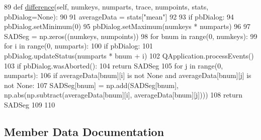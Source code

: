 \begin{DoxyCode}
89     \textcolor{keyword}{def }\hyperlink{classsoftware_1_1chipwhisperer_1_1analyzer_1_1utils_1_1TraceExplorerScripts_1_1PartitionDisplay_1_1DifferenceModeSAD_a0590799aa1f80c95b6f3bf358add5cf7}{difference}(self, numkeys, numparts, trace, numpoints, stats, pbDialog=None):
90 
91         averageData = stats[\textcolor{stringliteral}{"mean"}]
92 
93         \textcolor{keywordflow}{if} pbDialog:
94             pbDialog.setMinimum(0)
95             pbDialog.setMaximum(numkeys * numparts)
96 
97         SADSeg = np.zeros((numkeys, numpoints))
98         \textcolor{keywordflow}{for} bnum \textcolor{keywordflow}{in} range(0, numkeys):
99             \textcolor{keywordflow}{for} i \textcolor{keywordflow}{in} range(0, numparts):
100                 \textcolor{keywordflow}{if} pbDialog:
101                     pbDialog.updateStatus(numparts * bnum + i)
102                     QApplication.processEvents()
103                     \textcolor{keywordflow}{if} pbDialog.wasAborted():
104                         \textcolor{keywordflow}{return} SADSeg
105                 \textcolor{keywordflow}{for} j \textcolor{keywordflow}{in} range(0, numparts):
106                     \textcolor{keywordflow}{if} averageData[bnum][i] \textcolor{keywordflow}{is} \textcolor{keywordflow}{not} \textcolor{keywordtype}{None} \textcolor{keywordflow}{and} averageData[bnum][j] \textcolor{keywordflow}{is} \textcolor{keywordflow}{not} \textcolor{keywordtype}{None}:
107                         SADSeg[bnum] = np.add(SADSeg[bnum], np.abs(np.subtract(averageData[bnum][i], 
      averageData[bnum][j])))
108         \textcolor{keywordflow}{return} SADSeg
109 
110 
\end{DoxyCode}


\subsection{Member Data Documentation}
\hypertarget{classsoftware_1_1chipwhisperer_1_1analyzer_1_1utils_1_1TraceExplorerScripts_1_1PartitionDisplay_1_1DifferenceModeSAD_adeab64150fd0e4c9210ad903a4382200}{}
